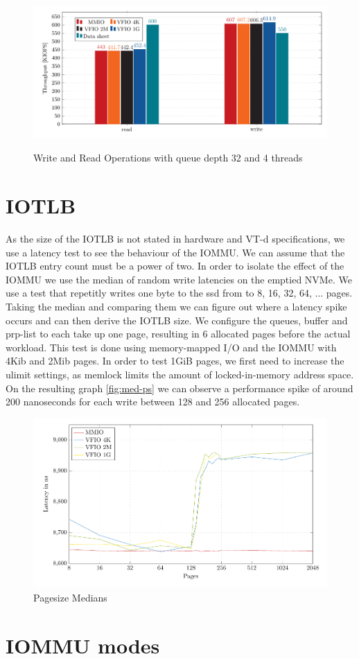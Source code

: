 \begin{figure}
    \centering
    \includegraphics[width=\textwidth]{figures/throughputqd32t1singlepage} \label{fig:iopsq32t1sp}
    \caption{Write and Read Operations with queue depth 32 and 4 threads}
    \label{fig:ccdf}
\end{figure}

\section{IOTLB}
As the size of the IOTLB is not stated in hardware and VT-d specifications, we use a latency test to see the behaviour of the IOMMU. We can assume that the IOTLB entry count must be a power of two. In order to isolate the effect of the IOMMU we use the median of random write latencies on the emptied NVMe. We use a test that repetitly writes one byte to the ssd from to 8, 16, 32, 64, ... pages. Taking the median and comparing them we can figure out where a latency spike occurs and can then derive the IOTLB size. We configure the queues, buffer and prp-list to each take up one page, resulting in 6 allocated pages before the actual workload. This test is done using memory-mapped I/O and the IOMMU with 4Kib and 2Mib pages.
In order to test 1GiB pages, we first need to increase the ulimit settings, as memlock limits the amount of locked-in-memory address space.
On the resulting graph \autoref{fig:med-ps} we can observe a performance spike of around 200 nanoseconds for each write between 128 and 256 allocated pages.

\begin{figure}
    \centering
    \includegraphics[width=\textwidth]{figures/latency_ps_medians_full}
    \caption{Pagesize Medians}
    \label{fig:med-ps}
\end{figure}


\section{IOMMU modes}